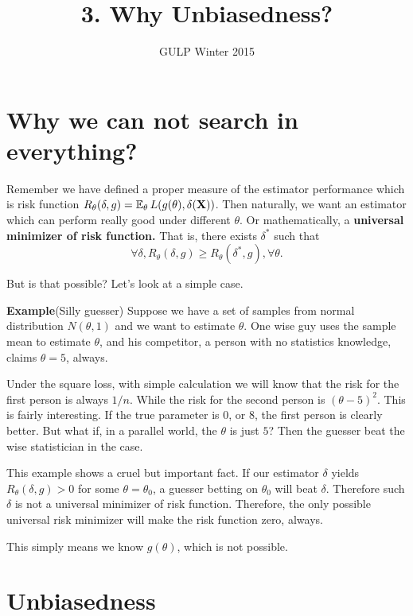 \documentclass[12pt]{article}
\newcommand{\1}{\mathbbm{1}}
\newcommand{\E}{\operatorname{\mathbb{E}}}
\begin{document}
\title{3. Why Unbiasedness?}%
\author{GULP Winter 2015} %
\maketitle

\section{Why we can not search in everything?}

Remember we have defined a proper measure of the estimator performance which is risk function $R_\theta(\delta, g) = \E_\theta L(g(\theta),\delta(\bf{X}))$. Then naturally, we want an estimator which can perform really good under different $\theta$. Or mathematically, a \textbf{universal minimizer of risk function.} That is, there exists $\delta^*$ such that
$$
\forall \delta, R_\theta(\delta, g) \geq R_\theta(\delta^*, g), \forall \theta.
$$

But is that possible? Let's look at a simple case.

\textbf{Example}(Silly guesser) Suppose we have a set of samples from normal distribution $N(\theta, 1)$ and we want to estimate $\theta$. One wise guy uses the sample mean to estimate $\theta$, and his competitor, a person with no statistics knowledge, claims $\theta =5 $, always.

Under the square loss, with simple calculation we will know that the risk for the first person is always $1/n$. While the risk for the second person is $(\theta - 5)^2$. This is fairly interesting. If the true parameter is $0$, or $8$, the first person is clearly better. But what if, in a parallel world, the $\theta$ is just $5 $? Then the guesser beat the wise statistician in the case.

This example shows a cruel but important fact. If our estimator $\delta $ yields $ R_\theta(\delta, g) > 0$ for some $\theta = \theta_0$, a guesser betting on $\theta_0$ will beat $\delta$. Therefore such $\delta$ is not a universal minimizer of risk function. Therefore, the only possible universal risk minimizer will make the risk function zero, always.

This simply means we know $g(\theta)$, which is not possible.

\section{Unbiasedness}
\end{document}
